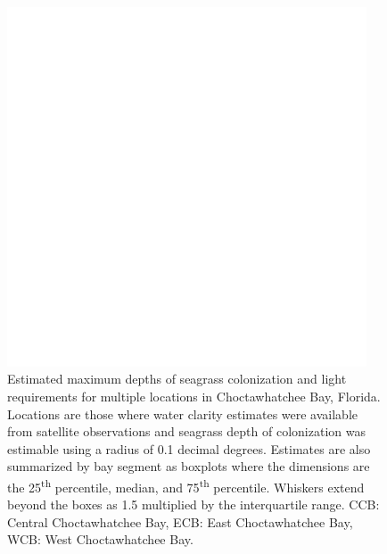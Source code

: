 \documentclass[letterpaper,12pt,oneside]{article}\usepackage[]{graphicx}\usepackage[]{color}
\begin{document}
\begin{figure}
\centering
\includegraphics[width = 0.95\textwidth]{figs/light_choc.pdf}
\caption{Estimated maximum depths of seagrass colonization and light requirements for multiple locations in Choctawhatchee Bay, Florida. Locations are those where water clarity estimates were available from satellite observations and seagrass depth of colonization was estimable using a radius of 0.1 decimal degrees.  Estimates are also summarized by bay segment as boxplots where the dimensions are the 25\textsuperscript{th} percentile, median, and 75\textsuperscript{th} percentile.  Whiskers extend beyond the boxes as 1.5 multiplied by the interquartile range. CCB: Central Choctawhatchee Bay, ECB: East Choctawhatchee Bay, WCB: West Choctawhatchee Bay.}
\label{fig:light_choc}
\end{figure}

\end{document}
